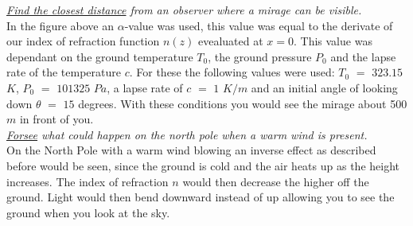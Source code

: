\documentclass{article}
\begin{document}
\textit{\underline{Find the closest distance} from an observer where a mirage can be visible.}\\
In the figure above an $\alpha$-value was used, this value was equal to the derivate of our index of refraction function $n(z)$ evealuated at $x=0$. This value was dependant on the ground temperature $T_0$, the ground pressure $P_0$ and the lapse rate of the temperature $c$. For these the following values were used: $T_0$ $=$ $323.15$ $K$, $P_0$ $=$ $101325$ $Pa$, a lapse rate of $c$ $=$ $1$ $K/m$ and an initial angle of looking down $\theta$ $=$ $15$ degrees. With these conditions you would see the mirage about 500 $m$ in front of you.\\


\textit{\underline{Forsee} what could happen on the north pole when a warm wind is present.}\\
On the North Pole with a warm wind blowing an inverse effect as described before would be seen, since the ground is cold and the air heats up as the height increases. The index of refraction $n$ would then decrease the higher off the ground. Light would then bend downward instead of up allowing you to see the ground when you look at the sky.
\end{document}
